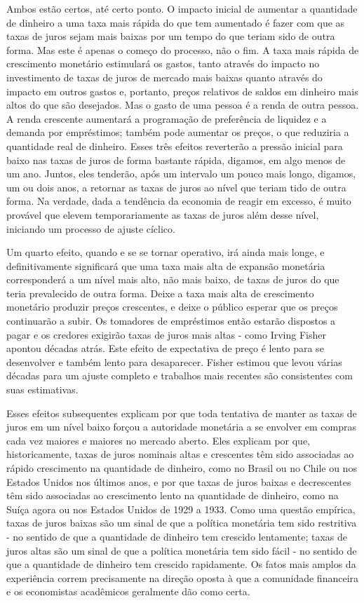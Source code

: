 \documentclass[12pt]{article}
\begin{document}
Ambos estão certos, até certo ponto. O impacto inicial de aumentar a quantidade de dinheiro a uma taxa mais rápida do que tem aumentado é fazer com que as taxas de juros sejam mais baixas por um tempo do que teriam sido de outra forma. Mas este é apenas o começo do processo, não o fim. A taxa mais rápida de crescimento monetário estimulará os gastos, tanto através do impacto no investimento de taxas de juros de mercado mais baixas quanto através do impacto em outros gastos e, portanto, preços relativos de saldos em dinheiro mais altos do que são desejados. Mas o gasto de uma pessoa é a renda de outra pessoa. A renda crescente aumentará a programação de preferência de liquidez e a demanda por empréstimos; também pode aumentar os preços, o que reduziria a quantidade real de dinheiro. Esses três efeitos reverterão a pressão inicial para baixo nas taxas de juros de forma bastante rápida, digamos, em algo menos de um ano. Juntos, eles tenderão, após um intervalo um pouco mais longo, digamos, um ou dois anos, a retornar as taxas de juros ao nível que teriam tido de outra forma. Na verdade, dada a tendência da economia de reagir em excesso, é muito provável que elevem temporariamente as taxas de juros além desse nível, iniciando um processo de ajuste cíclico.

Um quarto efeito, quando e se se tornar operativo, irá ainda mais longe, e definitivamente significará que uma taxa mais alta de expansão monetária corresponderá a um nível mais alto, não mais baixo, de taxas de juros do que teria prevalecido de outra forma. Deixe a taxa mais alta de crescimento monetário produzir preços crescentes, e deixe o público esperar que os preços continuarão a subir. Os tomadores de empréstimos então estarão dispostos a pagar e os credores exigirão taxas de juros mais altas - como Irving Fisher apontou décadas atrás. Este efeito de expectativa de preço é lento para se desenvolver e também lento para desaparecer. Fisher estimou que levou várias décadas para um ajuste completo e trabalhos mais recentes são consistentes com suas estimativas.

Esses efeitos subsequentes explicam por que toda tentativa de manter as taxas de juros em um nível baixo forçou a autoridade monetária a se envolver em compras cada vez maiores e maiores no mercado aberto. Eles explicam por que, historicamente, taxas de juros nominais altas e crescentes têm sido associadas ao rápido crescimento na quantidade de dinheiro, como no Brasil ou no Chile ou nos Estados Unidos nos últimos anos, e por que taxas de juros baixas e decrescentes têm sido associadas ao crescimento lento na quantidade de dinheiro, como na Suíça agora ou nos Estados Unidos de 1929 a 1933. Como uma questão empírica, taxas de juros baixas são um sinal de que a política monetária tem sido restritiva - no sentido de que a quantidade de dinheiro tem crescido lentamente; taxas de juros altas são um sinal de que a política monetária tem sido fácil - no sentido de que a quantidade de dinheiro tem crescido rapidamente. Os fatos mais amplos da experiência correm precisamente na direção oposta à que a comunidade financeira e os economistas acadêmicos geralmente dão como certa.
\end{document}
